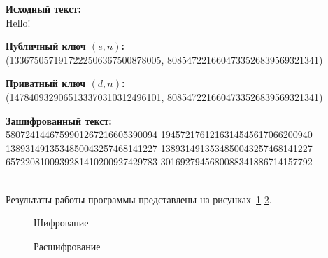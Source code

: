 \textbf{Исходный текст:} \\
    Hello!

\textbf{Публичный ключ $(e, n)$:} \\
    (1336750571917222506367500878005, 8085472216604733526839569321341)

\textbf{Приватный ключ $(d, n)$:} \\
    (1478409329065133370310312496101, 8085472216604733526839569321341)

\textbf{Зашифрованный текст:} \\
    5807241446759901267216605390094 1945721761216314545617066200940
    1389314913534850043257468141227 1389314913534850043257468141227
    6572208100939281410200927429783 3016927945680088341886714157792
    ~~~~~~~~~~~~~~~~~~~~~~~~~~~~~~~

Результаты работы программы представлены на рисунках~\ref{ris:encode-test-1}-\ref{ris:decode-test-1}.

\vspace{\baselineskip}
\begin{figure}[H]
    \caption{Шифрование}
\label{ris:encode-test-1}
\end{figure}

\vspace{\baselineskip}
\begin{figure}[H]
    \caption{Расшифрование}
\label{ris:decode-test-1}
\end{figure}

